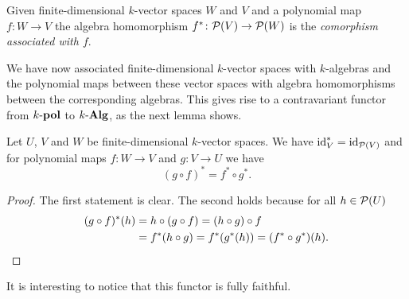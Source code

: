 \begin{defi}
  Given finite-dimensional $k$-vector spaces $W$ and $V$ and a polynomial map $f \colon W \to V$ the algebra homomorphism $f^* \colon \mathcal{P}(V) \to \mathcal{P}(W)$ is the \emph{comorphism associated with $f$}.
\end{defi}
  

We have now associated finite-dimensional $k$-vector spaces with $k$-algebras and the polynomial maps between these vector spaces with algebra homomorphisms between the corresponding algebras.
This gives rise to a contravariant functor from $k\text{-}\mathbf{pol}$ to $k\text{-}\mathbf{Alg}$, as the next lemma shows.


\begin{prop}
  Let $U$, $V$ and $W$ be finite-dimensional $k$-vector spaces.
  We have $\operatorname{id}_V^* = \operatorname{id}_{\mathcal{P}(V)}$ and for polynomial maps $f \colon W \to V$ and $g \colon V \to U$ we have
  \[
      (g \circ f)^*
    = f^* \circ g^*.
  \]
\end{prop}
\begin{proof}
  The first statement is clear.
  The second holds because for all $h \in \mathcal{P}(U)$
  \begin{align*}
      ( g \circ f)^*(h)
    &=  h \circ (g \circ f)
     =  (h \circ g) \circ f \\
    &=  f^* (h \circ g)
     =  f^*(g^*(h))
     = (f^* \circ g^*)(h).
    \qedhere
  \end{align*}
\end{proof}


It is interesting to notice that this functor is fully faithful.


